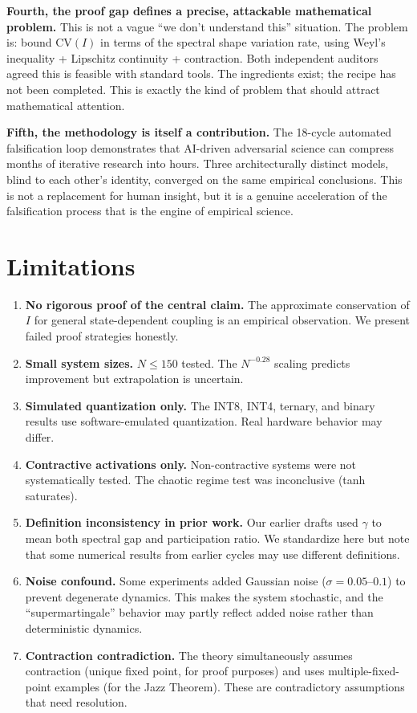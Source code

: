\documentclass[11pt]{article}
\begin{document}
\textbf{Fourth, the proof gap defines a precise, attackable mathematical problem.} This is not a vague ``we don't understand this'' situation. The problem is: bound $\mathrm{CV}(I)$ in terms of the spectral shape variation rate, using Weyl's inequality + Lipschitz continuity + contraction. Both independent auditors agreed this is feasible with standard tools. The ingredients exist; the recipe has not been completed. This is exactly the kind of problem that should attract mathematical attention.

\textbf{Fifth, the methodology is itself a contribution.} The 18-cycle automated falsification loop demonstrates that AI-driven adversarial science can compress months of iterative research into hours. Three architecturally distinct models, blind to each other's identity, converged on the same empirical conclusions. This is not a replacement for human insight, but it is a genuine acceleration of the falsification process that is the engine of empirical science.

\section{Limitations}

\begin{enumerate}
  \item \textbf{No rigorous proof of the central claim.} The approximate conservation of $I$ for general state-dependent coupling is an empirical observation. We present failed proof strategies honestly.
  \item \textbf{Small system sizes.} $N \leq 150$ tested. The $N^{-0.28}$ scaling predicts improvement but extrapolation is uncertain.
  \item \textbf{Simulated quantization only.} The INT8, INT4, ternary, and binary results use software-emulated quantization. Real hardware behavior may differ.
  \item \textbf{Contractive activations only.} Non-contractive systems were not systematically tested. The chaotic regime test was inconclusive (tanh saturates).
  \item \textbf{Definition inconsistency in prior work.} Our earlier drafts used $\gamma$ to mean both spectral gap and participation ratio. We standardize here but note that some numerical results from earlier cycles may use different definitions.
  \item \textbf{Noise confound.} Some experiments added Gaussian noise ($\sigma = 0.05$--$0.1$) to prevent degenerate dynamics. This makes the system stochastic, and the ``supermartingale'' behavior may partly reflect added noise rather than deterministic dynamics.
  \item \textbf{Contraction contradiction.} The theory simultaneously assumes contraction (unique fixed point, for proof purposes) and uses multiple-fixed-point examples (for the Jazz Theorem). These are contradictory assumptions that need resolution.
\end{enumerate}
\end{document}
